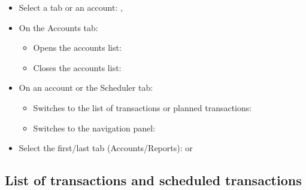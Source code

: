 \begin{itemize}
	\item Select a tab or an account: \keys{\arrowkeyup}, \keys{\arrowkeydown}%
	\item On the Accounts tab:%
	\begin{itemize}
		\item Opens the accounts list: \keys{\arrowkeyright}%
		\item Closes the accounts list: \keys{\arrowkeyleft}%
	\end{itemize}
	\item On an account or the Scheduler tab:%
	\begin{itemize}
		\item Switches to the list of transactions or planned transactions: \keys{\arrowkeyright}%
		\item Switches to the navigation panel: \keys{\arrowkeyleft}%
	\end{itemize}
	\item Select the first/last tab (Accounts/Reports):  or %
\end{itemize}


\subsection{List of transactions and scheduled transactions}


